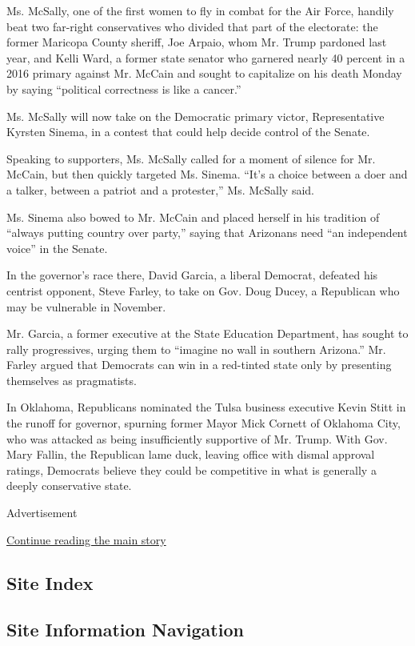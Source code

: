 Ms. McSally, one of the first women to fly in combat for the Air Force,
handily beat two far-right conservatives who divided that part of the
electorate: the former Maricopa County sheriff, Joe Arpaio, whom Mr.
Trump pardoned last year, and Kelli Ward, a former state senator who
garnered nearly 40 percent in a 2016 primary against Mr. McCain and
sought to capitalize on his death Monday by saying ``political
correctness is like a cancer.''

Ms. McSally will now take on the Democratic primary victor,
Representative Kyrsten Sinema, in a contest that could help decide
control of the Senate.

Speaking to supporters, Ms. McSally called for a moment of silence for
Mr. McCain, but then quickly targeted Ms. Sinema. ``It's a choice
between a doer and a talker, between a patriot and a protester,'' Ms.
McSally said.

Ms. Sinema also bowed to Mr. McCain and placed herself in his tradition
of ``always putting country over party,'' saying that Arizonans need
``an independent voice'' in the Senate.

In the governor's race there, David Garcia, a liberal Democrat, defeated
his centrist opponent, Steve Farley, to take on Gov. Doug Ducey, a
Republican who may be vulnerable in November.

Mr. Garcia, a former executive at the State Education Department, has
sought to rally progressives, urging them to ``imagine no wall in
southern Arizona.'' Mr. Farley argued that Democrats can win in a
red-tinted state only by presenting themselves as pragmatists.

In Oklahoma, Republicans nominated the Tulsa business executive Kevin
Stitt in the runoff for governor, spurning former Mayor Mick Cornett of
Oklahoma City, who was attacked as being insufficiently supportive of
Mr. Trump. With Gov. Mary Fallin, the Republican lame duck, leaving
office with dismal approval ratings, Democrats believe they could be
competitive in what is generally a deeply conservative state.

Advertisement

\protect\hyperlink{after-bottom}{Continue reading the main story}

\hypertarget{site-index}{%
\subsection{Site Index}\label{site-index}}

\hypertarget{site-information-navigation}{%
\subsection{Site Information
Navigation}\label{site-information-navigation}}

